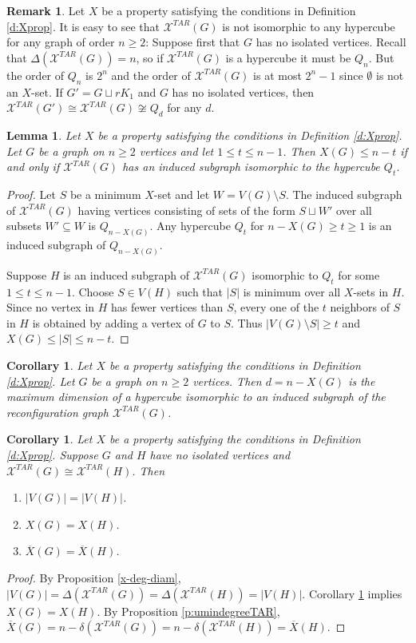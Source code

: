 \documentclass{article}
\numberwithin{figure}{section}   %
\newtheorem{cor}[thm]{Corollary}
\newtheorem{lem}[thm]{Lemma}
\theoremstyle{definition}
\newtheorem{rem}[thm]{Remark}
\theoremstyle{definition}
\theoremstyle{definition}
\newcommand{\ol}{\overline}
\newcommand{\ben}{\begin{enumerate}}
\newcommand{\een}{\end{enumerate}}
\newcommand{\bpf}{\begin{proof}}
\newcommand{\epf}{\end{proof}\ms}
\newcommand{\ms}{\medskip}
\newcommand{\xbar}{\ol X}
\newcommand{\xtar}{\mathscr{X}^{TAR}}
\begin{document}
\begin{rem} Let $X$ be a property satisfying the conditions in Definition \ref{d:Xprop}. It is easy to see that  $\xtar (G)$ is not isomorphic to any hypercube for any graph  of order $n\ge 2$:  Suppose first that $G$ has  no isolated vertices. Recall that $\Delta(\xtar(G))=n$, so if $\xtar(G)$ is a hypercube it must be $Q_n$. But the order of $Q_n$ is $2^n$ and the order of  $\xtar (G)$ is at most $2^n-1$ since $\emptyset$ is not an $X$-set. If $G'=G\sqcup rK_1$ and $G$ has no isolated vertices, then $\xtar(G')\cong\xtar(G)\not\cong Q_d$ for any $d$. 
 \end{rem}

\begin{lem}\label{L:uembedQt} Let $X$ be a property satisfying the conditions in Definition \ref{d:Xprop}.
Let $G$ be a graph on $n\geq 2$ vertices %
and let $1\leq t \leq n-1$. Then   $X(G)\leq n-t$ if and only if $\xtar(G)$ has an induced subgraph isomorphic to the hypercube $Q_t$. 
\end{lem}
\bpf %
Let $S$ be a minimum $X$-set and let $W=V(G)\setminus S$.  The induced subgraph of $\xtar(G)$ having vertices consisting of sets of the form $S\sqcup W'$ over all subsets $W'\subseteq W$  is $Q_{n-X(G)}$.  Any hypercube $Q_{t}$ for $n-X(G)\ge t\ge 1$ is an induced subgraph of $Q_{n-X(G)}$.

 Suppose $H$ is an induced subgraph of $\xtar(G)$ isomorphic to $Q_t$ for some $1\leq t \leq n-1$. Choose $S \in V(H)$ such that $|S|$ is minimum over all $X$-sets in $H$.  Since no vertex in $H$ has fewer vertices than $S$, every one of the $t$ neighbors of $S$ in $H$ is obtained by adding a vertex of $G$ to $S$.  Thus $|V(G)\setminus S| \ge t$ and $X(G)\le |S|\le n-t$.
\epf

\begin{cor}\label{c:X-Qt}Let $X$ be a property satisfying the conditions in Definition \ref{d:Xprop}.
Let $G$ be a graph on $n\geq 2$ vertices. %
Then $d=n-X(G)$ is the  maximum dimension of a hypercube isomorphic to an induced subgraph of the reconfiguration graph %
 $\xtar(G)$. 
\end{cor}

\begin{cor}\label{c:u-iso-props}Let $X$ be a property satisfying the conditions in Definition \ref{d:Xprop}.
Suppose $G$ and $H$ have no isolated vertices and $\xtar(G)\cong\xtar(H)$. Then
\ben
\item $|V(G)|=|V(H)|$.
\item $X(G)=X(H)$.
\item $\xbar(G)=\xbar(H)$. 

\een
\end{cor}
\bpf By Proposition \ref{x-deg-diam}, $|V(G)|=\Delta(\xtar(G))=\Delta(\xtar(H))=|V(H)|$. 
Corollary \ref{c:X-Qt} implies $X(G)=X(H)$. By Proposition \ref{p:umindegreeTAR}, $\xbar(G)=n-\delta(\xtar(G))=n-\delta(\xtar(H))=\xbar(H)$. 
\epf
\end{document}
